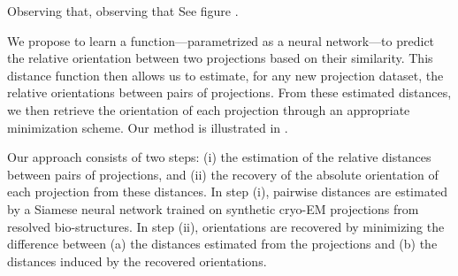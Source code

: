 Observing that, observing that
See figure .

We propose to learn a function---parametrized as a neural network---to predict the relative orientation between two projections based on their similarity.
This distance function then allows us to estimate, for any new projection dataset, the relative orientations between pairs of projections.
From these estimated distances, we then retrieve the orientation of each projection through an appropriate minimization scheme.
Our method is illustrated in .


    Our approach consists of two steps: (i) the estimation of the relative distances between pairs of projections, and (ii) the recovery of the absolute orientation of each projection from these distances.
    In step (i), pairwise distances are estimated by a Siamese neural network trained on synthetic cryo-EM projections from resolved bio-structures.
    In step (ii), orientations are recovered by minimizing the difference between (a) the distances estimated from the projections and (b) the distances induced by the recovered orientations.





